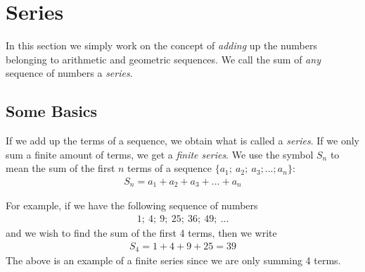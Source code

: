 

\section{Series}
\label{mp:se}
In this section we simply work on the concept of \textit{adding} up the numbers belonging to arithmetic and geometric sequences. We call the sum of \textit{any} sequence of numbers a \textit{series}.

\subsection{Some Basics}
If we add up the terms of a sequence, we obtain what is called a \textit{series}. If we only sum a finite amount of terms, we get a \textit{finite series}. We use the symbol $S_n$ to mean the sum of the first $n$ terms of a sequence
$\{a_1; \: a_2; \: a_3; \ldots ; a_n \}$:
\begin{eqnarray}
S_n = a_1 + a_2 + a_3 + \ldots + a_n
\end{eqnarray}

For example, if we have the following sequence of numbers
\begin{eqnarray*}
1; \: 4; \: 9; \: 25; \: 36; \: 49; \: \ldots
\end{eqnarray*}
and we wish to find the sum of the first 4 terms, then we write
\begin{eqnarray*}
S_4 = 1 + 4 + 9 + 25 = 39
\end{eqnarray*}
The above is an example of a finite series since we are only summing 4 terms.

